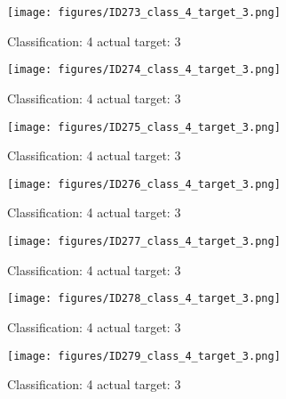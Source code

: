 \begin{figure}[h!]
\begin{center}
\texttt{[image: figures/ID273\_class\_4\_target\_3.png]}
\end{center}
\caption{ Classification: 4 actual target: 3}
\label{fig:ID273_class_4_target_3}
\end{figure}
\begin{figure}[h!]
\begin{center}
\texttt{[image: figures/ID274\_class\_4\_target\_3.png]}
\end{center}
\caption{ Classification: 4 actual target: 3}
\label{fig:ID274_class_4_target_3}
\end{figure}
\begin{figure}[h!]
\begin{center}
\texttt{[image: figures/ID275\_class\_4\_target\_3.png]}
\end{center}
\caption{ Classification: 4 actual target: 3}
\label{fig:ID275_class_4_target_3}
\end{figure}
\begin{figure}[h!]
\begin{center}
\texttt{[image: figures/ID276\_class\_4\_target\_3.png]}
\end{center}
\caption{ Classification: 4 actual target: 3}
\label{fig:ID276_class_4_target_3}
\end{figure}
\begin{figure}[h!]
\begin{center}
\texttt{[image: figures/ID277\_class\_4\_target\_3.png]}
\end{center}
\caption{ Classification: 4 actual target: 3}
\label{fig:ID277_class_4_target_3}
\end{figure}
\begin{figure}[h!]
\begin{center}
\texttt{[image: figures/ID278\_class\_4\_target\_3.png]}
\end{center}
\caption{ Classification: 4 actual target: 3}
\label{fig:ID278_class_4_target_3}
\end{figure}
\begin{figure}[h!]
\begin{center}
\texttt{[image: figures/ID279\_class\_4\_target\_3.png]}
\end{center}
\caption{ Classification: 4 actual target: 3}
\label{fig:ID279_class_4_target_3}
\end{figure}
